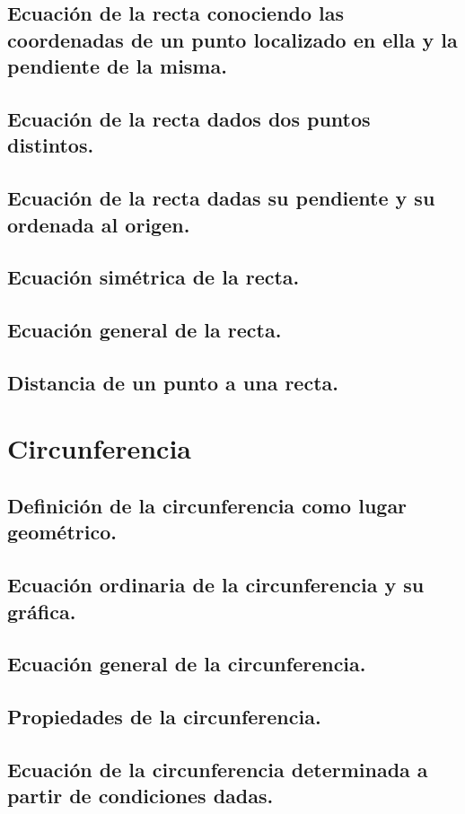 \subsection{Ecuación de la recta conociendo las coordenadas de un punto localizado en ella y la pendiente de la misma.}
\subsection{Ecuación de la recta dados dos puntos distintos.}
\subsection{Ecuación de la recta dadas su pendiente y su ordenada al origen.}
\subsection{Ecuación simétrica de la recta.}
\subsection{Ecuación general de la recta.}  
\subsection{Distancia de un punto a una recta.}





\section{Circunferencia} %
\subsection{Definición de la circunferencia como lugar geométrico.}
\subsection{Ecuación ordinaria de la circunferencia y su gráfica.}
\subsection{Ecuación general de la circunferencia.}
\subsection{Propiedades de la circunferencia.}
\subsection{Ecuación de la circunferencia determinada a partir de condiciones dadas.}






